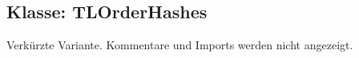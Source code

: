 \subsection{Klasse: TLOrderHashes}
\label{app:OrderHashes}
Verkürzte Variante. Kommentare und Imports werden nicht angezeigt.

\clearpage



